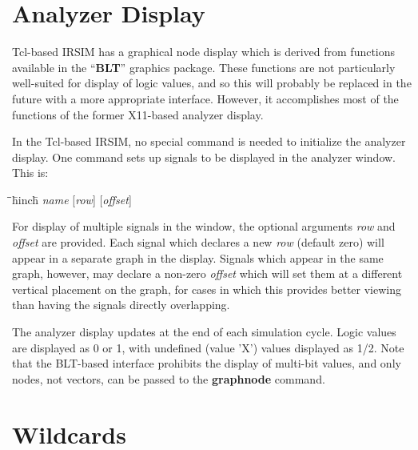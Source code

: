 \documentclass[letterpaper,twoside,12pt]{article}
\def\hinch{\hspace*{0.5in}}
\def\starti{\begin{center}\begin{tabbing}\hinch\=\hinch\=\hinch\=hinch\hinch\=\kill}
\def\endi{\end{tabbing}\end{center}}
\def\ii{\>\>\>}
\def\bstf{\bfseries\ttfamily}
\begin{document}
\section{Analyzer Display}

Tcl-based IRSIM has a graphical node display which is derived from
functions available in the ``{\bfseries BLT}'' graphics package.
These functions are not particularly well-suited for display of
logic values, and so this will probably be replaced in the future
with a more appropriate interface.  However, it accomplishes most
of the functions of the former X11-based analyzer display.

In the Tcl-based IRSIM, no special command is needed to initialize
the analyzer display.  One command sets up signals to be displayed
in the analyzer window.  This is:
\starti
   \ii {\bstf graphnode} {\itshape name}
	[{\itshape row}] [{\itshape offset}]
\endi
For display of multiple signals in the window, the optional arguments
{\itshape row} and {\itshape offset} are provided.  Each signal which
declares a new {\itshape row} (default zero) will appear in a separate
graph in the display.  Signals which appear in the same graph, however,
may declare a non-zero {\itshape offset} which will set them at a
different vertical placement on the graph, for cases in which this
provides better viewing than having the signals directly overlapping.

The analyzer display updates at the end of each simulation cycle.
Logic values are displayed as 0 or 1, with undefined (value 'X') values
displayed as 1/2.  Note that the BLT-based interface prohibits the
display of multi-bit values, and only nodes, not vectors, can be passed
to the {\bstf graphnode} command.

\section{Wildcards}
\end{document}
